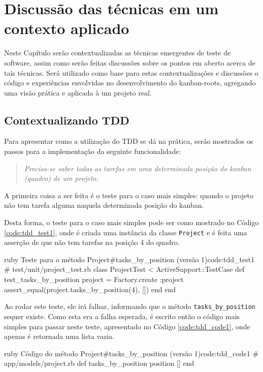 \chapter{Discussão das técnicas em um contexto aplicado}

Neste Capítulo serão contextualizadas as técnicas emergentes de teste de software, assim como serão feitas discussões sobre os pontos em aberto acerca de tais técnicas. Será utilizado como base para estas contextualizações e discussões o código e experiências envolvidas no desenvolvimento do kanban-roots, agregando uma visão prática e aplicada à um projeto real.

\section{Contextualizando TDD}
\label{sec:contextualizando_tdd}

Para apresentar como a utilização do TDD se dá na prática, serão mostrados os passos para a implementação da seguinte funcionalidade:

\begin{quote}
\textit{Precisa-se saber todas as tarefas em uma determinada posição do kanban (quadro) de um projeto.}
\end{quote}

A primeira coisa a ser feita é o teste para o caso mais simples: quando o projeto não tem tarefa alguma naquela determinada posição do kanban.

Desta forma, o teste para o caso mais simples pode ser como mostrado no Código \ref{code:tdd_test1}, onde é criada uma instância da classe \texttt{Project} e é feita uma asserção de que não tem tarefas na posição 4 do quadro.

\begin{mycode}{ruby}%
{Teste para o método Project\#tasks\_by\_position (versão 1)}{code:tdd_test1}
# test/unit/project_test.rb
class ProjectTest < ActiveSupport::TestCase
  def test_tasks_by_position
    project = Factory.create :project
    assert_equal(project.tasks_by_position(4), [])
  end
end
\end{mycode}

Ao rodar este teste, ele irá falhar, informando que o método \texttt{tasks\_by\_position} sequer existe. Como esta era a falha esperada, é escrito então o código mais simples para passar neste teste, apresentado no Código \ref{code:tdd_code1}, onde apenas é retornada uma lista vazia.

\begin{mycode}{ruby}%
{Código do método Project\#tasks\_by\_position (versão 1)}{code:tdd_code1}
# app/models/project.rb
def tasks_by_position position
  []
end
\end{mycode}


